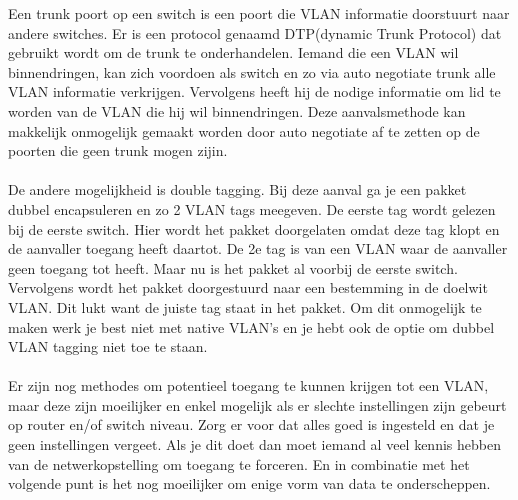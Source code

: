 \documentclass[pdftex,a4paper,12pt,twoside]{report}
\begin{document}
Een trunk poort op een switch is een poort die VLAN informatie doorstuurt naar andere switches. Er is een protocol genaamd DTP(dynamic Trunk Protocol) dat gebruikt wordt om de trunk te onderhandelen. Iemand die een VLAN wil binnendringen, kan zich voordoen als switch en zo via auto negotiate trunk alle VLAN informatie verkrijgen. Vervolgens heeft hij de nodige informatie om lid te worden van de VLAN die hij wil binnendringen. Deze aanvalsmethode kan makkelijk onmogelijk gemaakt worden door auto negotiate af te zetten op de poorten die geen trunk mogen zijin. \\ \\
De andere mogelijkheid is double tagging. Bij deze aanval ga je een pakket dubbel encapsuleren en zo 2 VLAN tags meegeven. De eerste tag wordt gelezen bij de eerste switch. Hier wordt het pakket doorgelaten omdat deze tag klopt en de aanvaller toegang heeft daartot. De 2e tag is van een VLAN waar de aanvaller geen toegang tot heeft. Maar nu is het pakket al voorbij de eerste switch. Vervolgens wordt het pakket doorgestuurd naar een bestemming in de doelwit VLAN. Dit lukt want de juiste tag staat in het pakket. Om dit onmogelijk te maken werk je best niet met native VLAN's en je hebt ook de optie om dubbel VLAN tagging niet toe te staan.
\\ \\
Er zijn nog methodes om potentieel toegang te kunnen krijgen tot een VLAN, maar deze zijn moeilijker en enkel mogelijk als er slechte instellingen zijn gebeurt op router en/of switch niveau. Zorg er voor dat alles goed is ingesteld en dat je geen instellingen vergeet. Als je dit doet dan moet iemand al veel kennis hebben van de netwerkopstelling om toegang te forceren.
En in combinatie met het volgende punt is het nog moeilijker om enige vorm van data te onderscheppen.
\end{document}

